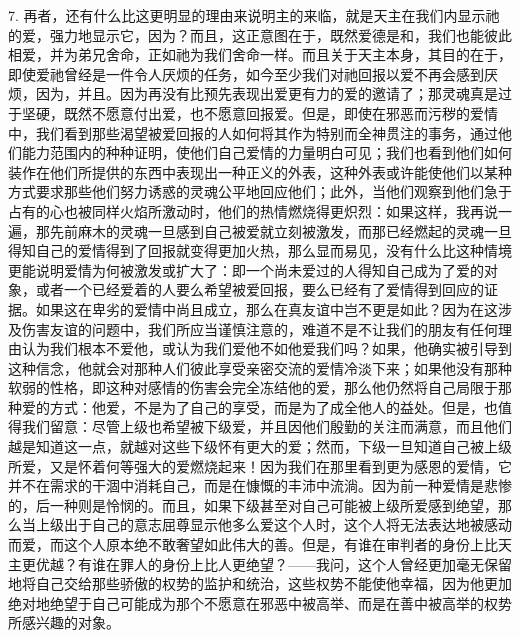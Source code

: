 7. 再者，还有什么比这更明显的理由来说明主的来临，就是天主在我们内显示祂的爱，强力地显示它，因为？而且，这正意图在于，既然爱德是和，我们也能彼此相爱，并为弟兄舍命，正如祂为我们舍命一样。而且关于天主本身，其目的在于，即使爱祂曾经是一件令人厌烦的任务，如今至少我们对祂回报以爱不再会感到厌烦，因为，并且。因为再没有比预先表现出爱更有力的爱的邀请了；那灵魂真是过于坚硬，既然不愿意付出爱，也不愿意回报爱。但是，即使在邪恶而污秽的爱情中，我们看到那些渴望被爱回报的人如何将其作为特别而全神贯注的事务，通过他们能力范围内的种种证明，使他们自己爱情的力量明白可见；我们也看到他们如何装作在他们所提供的东西中表现出一种正义的外表，这种外表或许能使他们以某种方式要求那些他们努力诱惑的灵魂公平地回应他们；此外，当他们观察到他们急于占有的心也被同样火焰所激动时，他们的热情燃烧得更炽烈：如果这样，我再说一遍，那先前麻木的灵魂一旦感到自己被爱就立刻被激发，而那已经燃起的灵魂一旦得知自己的爱情得到了回报就变得更加火热，那么显而易见，没有什么比这种情境更能说明爱情为何被激发或扩大了：即一个尚未爱过的人得知自己成为了爱的对象，或者一个已经爱着的人要么希望被爱回报，要么已经有了爱情得到回应的证据。如果这在卑劣的爱情中尚且成立，那么在真友谊中岂不更是如此？因为在这涉及伤害友谊的问题中，我们所应当谨慎注意的，难道不是不让我们的朋友有任何理由认为我们根本不爱他，或认为我们爱他不如他爱我们吗？如果，他确实被引导到这种信念，他就会对那种人们彼此享受亲密交流的爱情冷淡下来；如果他没有那种软弱的性格，即这种对感情的伤害会完全冻结他的爱，那么他仍然将自己局限于那种爱的方式：他爱，不是为了自己的享受，而是为了成全他人的益处。但是，也值得我们留意：尽管上级也希望被下级爱，并且因他们殷勤的关注而满意，而且他们越是知道这一点，就越对这些下级怀有更大的爱；然而，下级一旦知道自己被上级所爱，又是怀着何等强大的爱燃烧起来！因为我们在那里看到更为感恩的爱情，它并不在需求的干涸中消耗自己，而是在慷慨的丰沛中流淌。因为前一种爱情是悲惨的，后一种则是怜悯的。而且，如果下级甚至对自己可能被上级所爱感到绝望，那么当上级出于自己的意志屈尊显示他多么爱这个人时，这个人将无法表达地被感动而爱，而这个人原本绝不敢奢望如此伟大的善。但是，有谁在审判者的身份上比天主更优越？有谁在罪人的身份上比人更绝望？——我问，这个人曾经更加毫无保留地将自己交给那些骄傲的权势的监护和统治，这些权势不能使他幸福，因为他更加绝对地绝望于自己可能成为那个不愿意在邪恶中被高举、而是在善中被高举的权势所感兴趣的对象。\par


